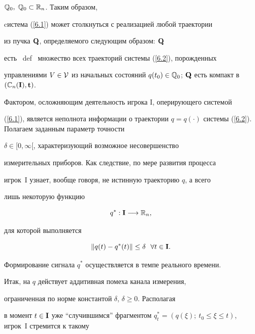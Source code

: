 $\Bbb{Q}_0,\; \Bbb{Q}_0 \subset \Bbb{R}_n$. Таким образом,


cистема (\ref{6.1}) может столкнуться с реализацией любой траектории


из пучка $\bold{Q}$, определяемого следующим образом: $\bold{Q}$


есть \ def \ множество всех траекторий системы (\ref{6.2}), порожденных


управлениями $V \in \cal{V}$ из начальных состояний ${q(t_0)} \in


\Bbb{Q}_0$; $\bold{Q}$ есть компакт в $


({\Bbb{C}_n}(\bold{I)},\bold{t})$.





Фактором, осложняющим деятельность игрока I, оперирующего системой


(\ref{6.1}), является неполнота информации о траектории $q =


q(\cdot)$ системы (\ref{6.2}). Полагаем заданным параметр точности


$\delta \in [0,\infty[$, характеризующий возможное несовершенство


измерительных приборов. Как следствие, по мере развития процесса


игрок~I узнает, вообще говоря, не истинную траекторию $q$, а всего


лишь некоторую функцию


\begin{equation}\label{6.4}


{q^*}:\bold{I}\lo \Bbb{R}_n,


\end{equation}


для которой выполняется


\begin{equation}\label{6.4'}


\|{q(t)} - {q^*}(t)\| \le \delta\ \ \fo{t} \in \bold{I}.


\end{equation}


Формирование сигнала $q^*$ осуществляется в темпе реального времени.


Итак, на $q$ действует аддитивная помеха канала измерения,


ограниченная по норме константой $\delta$, $\delta \ge 0$. Располагая


в момент $t \in \bold{I}$ уже ``случившимся'' фрагментом ${q_t^*} =


({q(\xi)};\ {t_0} \le \xi \le t)$, игрок~I стремится к такому


